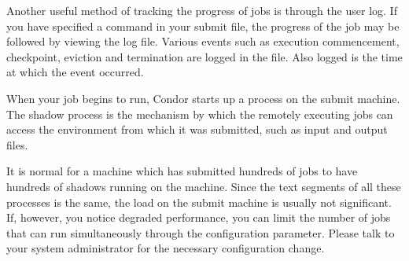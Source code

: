 Another useful method of tracking the progress of jobs is through the
user log.  If you have specified a  command in 
your submit file, the progress of the job may be followed by viewing the
log file.  Various events such as execution commencement, checkpoint, eviction 
and termination are logged in the file.
Also logged is the time at which the event occurred.

When your job begins to run, Condor starts up a  process
on the submit machine.  The shadow process is the mechanism by which the
remotely executing jobs can access the environment from which it was
submitted, such as input and output files.  

It is normal for a machine which has submitted hundreds of jobs to have 
hundreds of shadows running on the machine.  Since the text segments of 
all these processes is the same, the load on the submit machine is usually 
not significant.  If, however, you notice degraded performance, you can limit 
the number of jobs that can run simultaneously through the 
 configuration parameter.  Please talk to your 
system administrator for the necessary configuration change.

